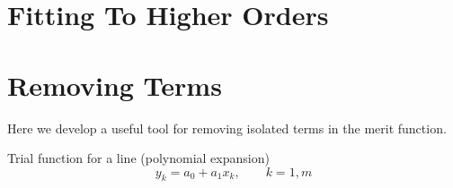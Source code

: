 \section{Fitting To Higher Orders}  %

\section{Removing Terms}  %
Here we develop a useful tool for removing isolated terms in the merit function.

Trial function for a line (polynomial expansion)
  \begin{equation*}   %
      y_{k} = a_{0} + a_{1} x_{k}, \qquad k = 1, m
  \end{equation*}

